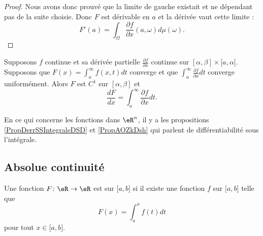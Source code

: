 \begin{proof}
        Nous avons donc prouvé que la limite de gauche existait et ne dépendant pas de la suite choisie. Donc \( F\) est dérivable en \( a\) et la dérivée vaut cette limite :
        \begin{equation}
            F'(a)=\int_{\Omega}\frac{ \partial f }{ \partial x }(a,\omega)d\mu(\omega).
        \end{equation}
\end{proof}

\begin{theorem}
		Supposons $f$ continue et sa dérivée partielle $\frac{ \partial f }{ \partial x }$ continue sur $[\alpha,\beta]\times[a,\alpha[$. Supposons que $F(x)=\int_a^{\infty}f(x,t)dt$ converge et que $\int_a^{\infty}\frac{ \partial f }{ \partial x }dt$ converge uniformément. Alors $F$ est $C^1$ sur $[\alpha,\beta]$ et 
		\begin{equation}
			\frac{ dF }{ dx }=\int_a^{\infty}\frac{ \partial f }{ \partial x }dt.
		\end{equation}
\end{theorem}

En ce qui concerne les fonctions dans \( \eR^n\), il y a les  propositions \ref{PropDerrSSIntegraleDSD} et \ref{PropAOZkDsh} qui parlent de différentiabilité sous l'intégrale.

\subsection{Absolue continuité}

\begin{definition}      \label{DefAbsoluCont}
    Une fonction \( F\colon \eR\to \eR\) est  sur \( \mathopen[ a , b \mathclose]\) si il existe une fonction \( f\) sur \( \mathopen[ a , b \mathclose]\) telle que
    \begin{equation}
        F(x)=\int_a^xf(t)dt
    \end{equation}
    pour tout \( x\in\mathopen[ a , b \mathclose]\).
\end{definition}


